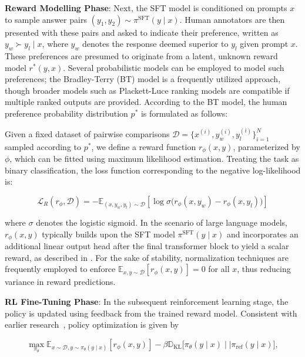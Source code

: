 \textbf{Reward Modelling Phase}: Next, the SFT model is conditioned on prompts $x$ to sample answer pairs $(y_1, y_2)\sim \pi^\text{SFT}(y \mid x)$. Human annotators are then presented with these pairs and asked to indicate their preference, written as $y_w\succ y_l \mid x$, where $y_w$ denotes the response deemed superior to $y_l$ given prompt $x$. These preferences are presumed to originate from a latent, unknown reward model $r^*(y, x)$. Several probabilistic models can be employed to model such preferences; the Bradley-Terry (BT) model \cite{bradley1952rankanalysis} is a frequently utilized approach, though broader models such as Plackett-Luce ranking models \citep{plackett1975analysis, luce2012individual} are compatible if multiple ranked outputs are provided. According to the BT model, the human preference probability distribution $p^*$ is formulated as follows:

Given a fixed dataset of pairwise comparisons $\mathcal{D}=\bigl\{x^{(i)}, y_w^{(i)}, y_l^{(i)}\bigr\}_{i=1}^N$ sampled according to $p^*$, we define a reward function $r_{\phi}(x, y)$, parameterized by $\phi$, which can be fitted using maximum likelihood estimation. Treating the task as binary classification, the loss function corresponding to the negative log-likelihood is:

\begin{equation}\label{eq:reward_model}
    \mathcal{L}_R(r_{\phi}, \mathcal{D}) = -\mathbb{E}_{(x, y_w, y_l)\sim \mathcal{D}}\left[\log \sigma\bigl(r_{\phi}(x, y_w)- r_{\phi}(x, y_l)\bigr)\right]
\end{equation}

where $\sigma$ denotes the logistic sigmoid. In the scenario of large language models, $r_{\phi}(x, y)$ typically builds upon the SFT model $\pi^\text{SFT}(y \mid x)$ and incorporates an additional linear output head after the final transformer block to yield a scalar reward, as described in \cite{ziegler2020finetuning}. For the sake of stability, normalization techniques are frequently employed to enforce $\mathbb{E}_{x,y\sim \mathcal{D}}\left[r_\phi(x, y)\right] = 0$ for all $x$, thus reducing variance in reward predictions.

\textbf{RL Fine-Tuning Phase}: In the subsequent reinforcement learning stage, the policy is updated using feedback from the trained reward model. Consistent with earlier research~\citep{jaques2017sequence, jaques2020human}, policy optimization is given by

\begin{equation}\label{eq:RL}
\max_{\pi_{\theta}}  \mathbb{E}_{x\sim \mathcal{D}, y\sim \pi_{\theta}(y \mid x)}\left[r_{\phi}(x, y)\right] - \beta\mathbb{D}_{\textrm{KL}}\bigl[\pi_{\theta}(y\mid x)\mid \mid \pi_\text{ref}(y\mid x)\bigr],
\end{equation}

